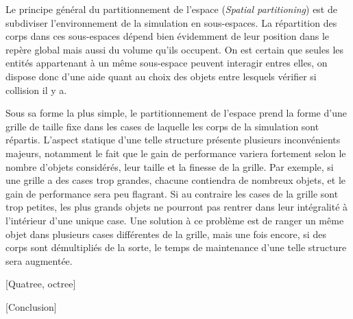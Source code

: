 Le principe général du partitionnement de l'espace (\textit{Spatial
  partitioning}) est de subdiviser l'environnement de la simulation en
sous-espaces. La répartition des corps dans ces sous-espaces dépend
bien évidemment de leur position dans le repère global mais aussi du
volume qu'ils occupent. On est certain que seules les entités
appartenant à un même sous-espace peuvent interagir entres elles, on
dispose donc d'une aide quant au choix des objets entre lesquels
vérifier si collision il y a.

Sous sa forme la plus simple, le partitionnement de l'espace prend la
forme d'une grille de taille fixe dans les cases de laquelle les corps
de la simulation sont répartis. L'aspect statique d'une telle
structure présente plusieurs inconvénients majeurs, notamment le fait
que le gain de performance variera fortement selon le nombre d'objets
considérés, leur taille et la finesse de la grille. Par exemple, si
une grille a des cases trop grandes, chacune contiendra de nombreux
objets, et le gain de performance sera peu flagrant. Si au contraire
les cases de la grille sont trop petites, les plus grands objets ne
pourront pas rentrer dans leur intégralité à l'intérieur d'une unique
case. Une solution à ce problème est de ranger un même objet dans
plusieurs cases différentes de la grille, mais une fois encore, si des
corps sont démultipliés de la sorte, le temps de maintenance d'une
telle structure sera augmentée.

[Quatree, octree]

[Conclusion]
